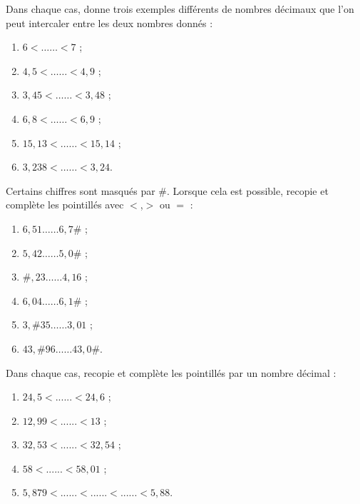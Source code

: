 \begin{exercice}
Dans chaque cas, donne trois exemples différents de nombres décimaux que l'on peut intercaler entre les deux nombres donnés :
\begin{enumerate}
 \item $6 < …… < 7$ ;
 \item $4,5 < …… < 4,9$ ;
 \item $3,45 < …… < 3,48$ ;
 \item $6,8 < …… < 6,9$ ;
 \item $15,13 < …… < 15,14$ ;
 \item $3,238 < …… < 3,24$.
 \end{enumerate}
\end{exercice}


\begin{exercice}
Certains chiffres sont masqués par \#. Lorsque cela est possible, recopie et complète les pointillés avec $<$,$>$ ou $=$ :
\begin{enumerate} 
 \item $6,51 …… 6,7\#$ ;
 \item $5,42 …… 5,0\#$ ;
 \item $\#,23 …… 4,16$ ;
 \item $6,04 …… 6,1\#$ ;
 \item $3,\#35 …… 3,01$ ;
 \item $43,\#96 …… 43,0\#$.
 \end{enumerate}
\end{exercice}


\begin{exercice}
Dans chaque cas, recopie et complète les pointillés par un nombre décimal :
\begin{enumerate} 
 \item $24,5 < ...... < 24,6$ ;  
 
 \item $12,99 < ...... < 13$ ; 
 
 \item $32,53 < ...... < 32,54$ ; 
 
 \item $58 < ...... < 58,01$ ; 
 
 \item $5,879 < ...... < ...... < ...... < 5,88$. 

 \end{enumerate}
\end{exercice}


